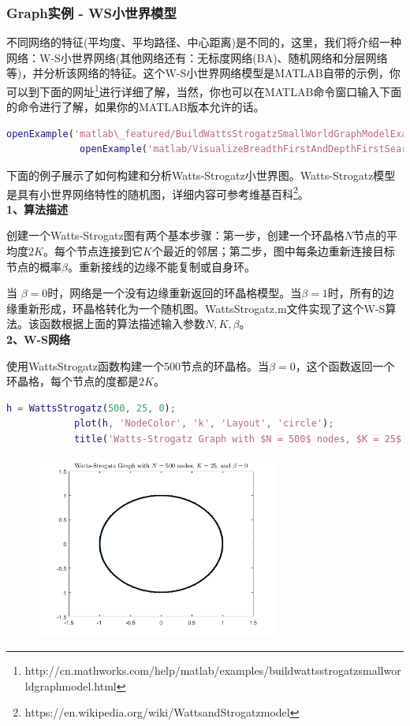         \subsubsection{Graph实例 - WS小世界模型}
             不同网络的特征(平均度、平均路径、中心距离)是不同的，这里，我们将介绍一种网络：W-S小世界网络(其他网络还有：无标度网络(BA)、随机网络和分层网络等)，并分析该网络的特征。这个W-S小世界网络模型是MATLAB自带的示例，你可以到下面的网址\footnote{http://cn.mathworks.com/help/matlab/examples/buildwattsstrogatzsmallworldgraphmodel.html}进行详细了解，当然，你也可以在MATLAB命令窗口输入下面的命令进行了解，如果你的MATLAB版本允许的话。
             \begin{lstlisting}[language = Matlab]
             openExample('matlab\_featured/BuildWattsStrogatzSmallWorldGraphModelExample')
             openExample('matlab/VisualizeBreadthFirstAndDepthFirstSearchExample')
             \end{lstlisting}
             \par
            下面的例子展示了如何构建和分析Watts-Strogatz小世界图。Watts-Strogatz模型是具有小世界网络特性的随机图，详细内容可参考维基百科\footnote{https://en.wikipedia.org/wiki/WattsandStrogatzmodel}。\\
            \textbf{1、算法描述}
            \par
            创建一个Watts-Strogatz图有两个基本步骤：第一步，创建一个环晶格$N$节点的平均度$2K$。每个节点连接到它$K$个最近的邻居；第二步，图中每条边重新连接目标节点的概率$\beta$。重新接线的边缘不能复制或自身环。
            \par
            当 $\beta = 0$时，网络是一个没有边缘重新返回的环晶格模型。当$\beta = 1$时，所有的边缘重新形成，环晶格转化为一个随机图。WattsStrogatz.m文件实现了这个W-S算法。该函数根据上面的算法描述输入参数$N,K,\beta$。\\
            \textbf{2、W-S网络}
            \par
            使用WattsStrogatz函数构建一个500节点的环晶格。当$\beta=0$，这个函数返回一个环晶格，每个节点的度都是$2K$。
            \begin{lstlisting}[language=Matlab]
            h = WattsStrogatz(500, 25, 0);
            plot(h, 'NodeColor', 'k', 'Layout', 'circle');
            title('Watts-Strogatz Graph with $N = 500$ nodes, $K = 25$, and $\beta = 0$','Interpreter','latex')
            \end{lstlisting}
            \begin{figure}[H]
            \centering
            \includegraphics[height=6cm]{images/37.jpg}
            \end{figure}
